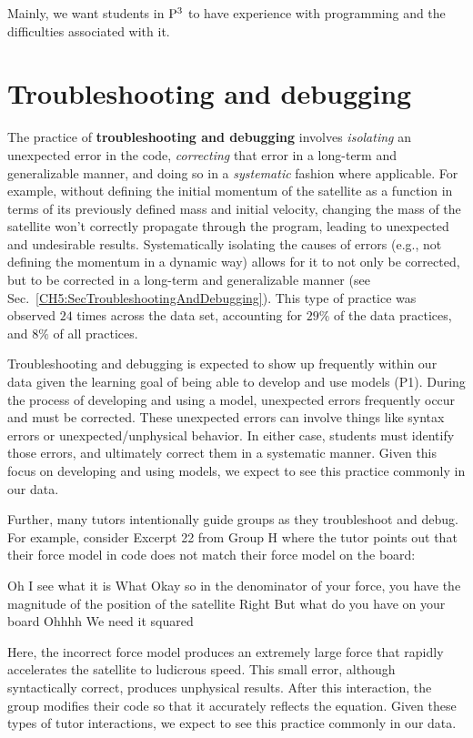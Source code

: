 \documentclass{msuphddissertation}
\begin{document}
\begin{doublespace}
\begin{appendices}
Mainly, we want students in ${\rm P}^{3}$ to have experience with programming and the difficulties associated with it.

\section*{Troubleshooting and debugging}

The practice of \textbf{troubleshooting and debugging} involves \textit{isolating} an unexpected error in the code, \textit{correcting} that error in a long-term and generalizable manner, and doing so in a \textit{systematic} fashion where applicable.  For example, without defining the initial momentum of the satellite as a function in terms of its previously defined mass and initial velocity, changing the mass of the satellite won't correctly propagate through the program, leading to unexpected and undesirable results.  Systematically isolating the causes of errors (e.g., not defining the momentum in a dynamic way) allows for it to not only be corrected, but to be corrected in a long-term and generalizable manner (see Sec.~\ref{CH5:SecTroubleshootingAndDebugging}).  This type of practice was observed $24$ times across the data set, accounting for $29\%$ of the data practices, and $8\%$ of all practices.

Troubleshooting and debugging is expected to show up frequently within our data given the learning goal of being able to develop and use models (P1).  During the process of developing and using a model, unexpected errors frequently occur and must be corrected.  These unexpected errors can involve things like syntax errors or unexpected/unphysical behavior.  In either case, students must identify those errors, and ultimately correct them in a systematic manner.  Given this focus on developing and using models, we expect to see this practice commonly in our data.

Further, many tutors intentionally guide groups as they troubleshoot and debug.  For example, consider Excerpt 22 from Group H where the tutor points out that their force model in code does not match their force model on the board: \begin{description}
\TA Oh I see what it is
\SB What
\TA Okay so in the denominator of your force, you have the magnitude of the position of the satellite
\SB Right
\TA But what do you have on your board
\SB Ohhhh
\SC We need it squared
\end{description}  Here, the incorrect force model produces an extremely large force that rapidly accelerates the satellite to ludicrous speed.  This small error, although syntactically correct, produces unphysical results.  After this interaction, the group modifies their code so that it accurately reflects the equation.  Given these types of tutor interactions, we expect to see this practice commonly in our data.


\end{appendices}
\end{doublespace}
\end{document}
